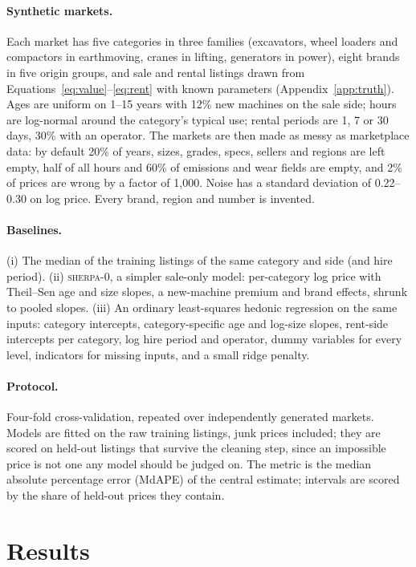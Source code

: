 \documentclass[11pt]{article}
\begin{document}
\paragraph{Synthetic markets.}
Each market has five categories in three families (excavators, wheel loaders and compactors in
earthmoving, cranes in lifting, generators in power), eight brands in five origin groups, and
sale and rental listings drawn from Equations~\eqref{eq:value}--\eqref{eq:rent} with known
parameters (Appendix~\ref{app:truth}). Ages are uniform on 1--15 years with 12\% new machines on
the sale side; hours are log-normal around the category's typical use; rental periods are 1, 7 or
30 days, 30\% with an operator. The markets are then made as messy as marketplace data: by default
20\% of years, sizes, grades, specs, sellers and regions are left empty, half of all hours and 60\%
of emissions and wear fields are empty, and 2\% of prices are wrong by a factor of 1{,}000. Noise
has a standard deviation of 0.22--0.30 on log price. Every brand, region and number is invented.

\paragraph{Baselines.}
(i) The median of the training listings of the same category and side (and hire period).
(ii) \textsc{sherpa-0}, a simpler sale-only model: per-category log price with Theil--Sen age and
size slopes, a new-machine premium and brand effects, shrunk to pooled slopes. (iii) An ordinary
least-squares hedonic regression on the same inputs: category intercepts, category-specific age and
log-size slopes, rent-side intercepts per category, log hire period and operator, dummy variables
for every level, indicators for missing inputs, and a small ridge penalty.

\paragraph{Protocol.}
Four-fold cross-validation, repeated over independently generated markets. Models are fitted on the
raw training listings, junk prices included; they are scored on held-out listings that survive the
cleaning step, since an impossible price is not one any model should be judged on. The metric is
the median absolute percentage error (MdAPE) of the central estimate; intervals are scored by the
share of held-out prices they contain.

\section{Results}
\label{sec:results}
\end{document}
